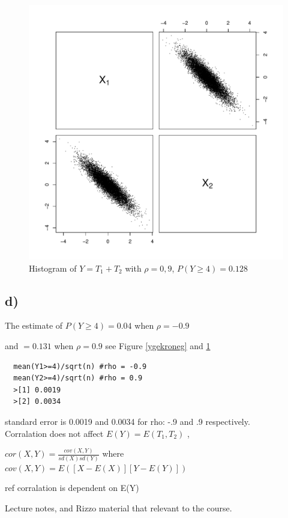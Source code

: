 \documentclass[a4paper, 11pt]{article}
\begin{document}
\begin{figure}[H]
  \centering
  \includegraphics[scale=0.5,page=8]{Rplots4.pdf}
  \caption{Histogram of $Y=T_1 + T_2$ with $\rho = 0,9$, $P(Y\geq4) = 0.128$}
  \label{ygekropos}
\end{figure}

\subsection*{d)}
The estimate of $P(Y\geq4) = 0.04$ when $\rho = -0.9$

and $=0.131$ when $\rho = 0.9$ see Figure \ref{ygekroneg} and \ref{ygekropos}

\begin{lstlisting}
  mean(Y1>=4)/sqrt(n) #rho = -0.9
  mean(Y2>=4)/sqrt(n) #rho = 0.9
  >[1] 0.0019
  >[2] 0.0034
\end{lstlisting}

standard error is 0.0019 and 0.0034 for rho: -.9 and .9 respectively.\\

Corralation does not affect $E(Y) = E(T_1,T_2)$ ,

$cor(X,Y) = \frac{cov(X,Y)}{sd(X)sd(Y)}$ where $cov(X,Y) = E([X-E(X)][Y-E(Y)])$

ref \cite{referencja} corralation is dependent on E(Y)

\begin{thebibliography}{9}
  
  Lecture notes, and Rizzo material that relevant to the course.

\end{thebibliography}
\end{document}

